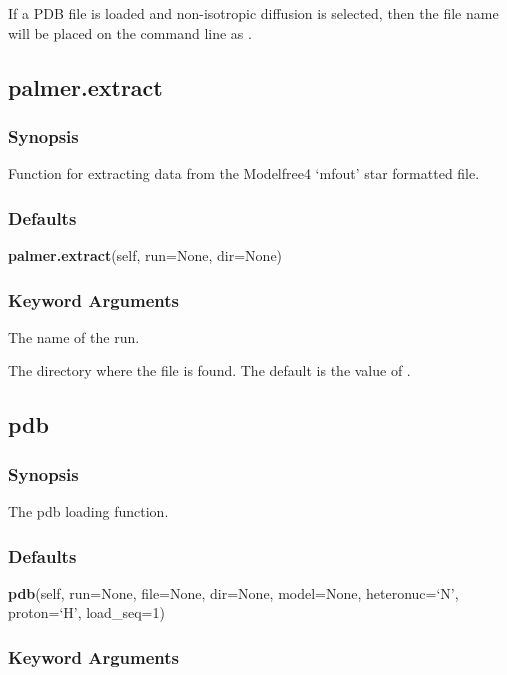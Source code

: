 If a PDB file is loaded and non-isotropic diffusion is selected, then the file name will be
placed on the command line as 
.


\newpage

\subsection{palmer.extract}


\subsubsection{Synopsis}

Function for extracting data from the Modelfree4 `mfout' star formatted file.

\subsubsection{Defaults}

\textsf{\textbf{palmer.extract}(self, run=None, dir=None)}


\subsubsection{Keyword Arguments}


  The name of the run.

  The directory where the file 
 is found.  The default is the value of 
.


\newpage

\subsection{pdb}


\subsubsection{Synopsis}

The pdb loading function.

\subsubsection{Defaults}

\textsf{\textbf{pdb}(self, run=None, file=None, dir=None, model=None, heteronuc=`N', proton=`H', load\_seq=1)}


\subsubsection{Keyword Arguments}


